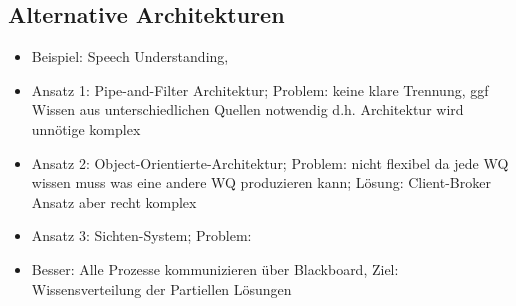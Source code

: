 \documentclass{article} %
\begin{document}
	\subsection{Alternative Architekturen}
	\begin{itemize}
		\item Beispiel: Speech Understanding,
		\item Ansatz 1: Pipe-and-Filter Architektur; Problem: keine klare Trennung, ggf Wissen aus unterschiedlichen Quellen notwendig d.h. Architektur wird unnötige komplex
		\item Ansatz 2: Object-Orientierte-Architektur; Problem: nicht flexibel da jede WQ wissen muss was eine andere WQ produzieren kann; Lösung: Client-Broker Ansatz aber recht komplex
		\item Ansatz 3: Sichten-System; Problem: 
		\item Besser: Alle Prozesse kommunizieren über Blackboard, Ziel: Wissensverteilung der Partiellen Lösungen
	\end{itemize}
\end{document}
